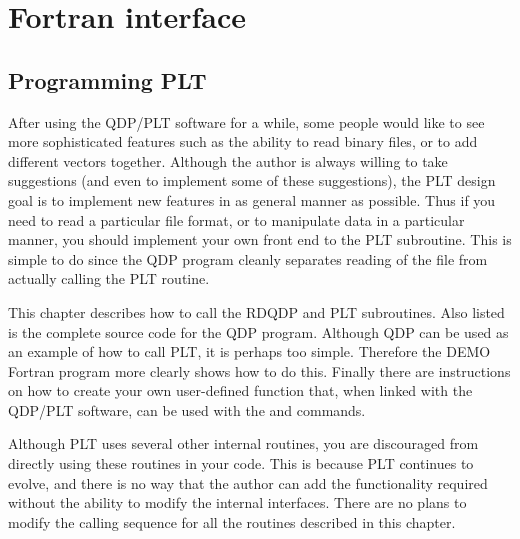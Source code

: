 \chapter{Fortran interface}
\raggedbottom

\section{Programming PLT}
After using the QDP/PLT software for a while, some people would like
to see more sophisticated features such as the ability to read binary
files, or to add different vectors together.
Although the author is always willing to take suggestions (and even
to implement some of these suggestions),
the PLT design goal is to implement new features in as general manner
as possible.
Thus if you need to read a particular file format,
or to manipulate data in a particular manner,
you should implement your own front end to the PLT subroutine.
This is simple to do since the QDP program cleanly separates reading
of the file from actually calling the PLT routine.

This chapter describes how to call the RDQDP and PLT subroutines.
Also listed is the complete source code for the QDP program.
Although QDP can be used as an example of how to call PLT,
it is perhaps too simple.
Therefore the DEMO Fortran program more clearly shows how to do this.
Finally there are instructions on how to create your own user-defined
function that, when linked with the QDP/PLT software, can be used with
the \verb@Model@ and \verb@Fit@ commands.

Although PLT uses several other internal routines, you are discouraged
from directly using these routines in your code.
This is because PLT continues to evolve,
and there is no way that the author can add the functionality required
without the ability to modify the internal interfaces.
There are no plans to modify the calling sequence for all the
routines described in this chapter.

\pagebreak
